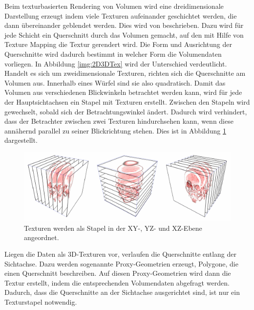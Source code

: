 Beim texturbasierten Rendering von Volumen wird eine dreidimensionale Darstellung erzeugt indem viele Texturen aufeinander geschichtet werden, die dann übereinander geblendet werden. Dies wird von \cite{kniss02} beschrieben. Dazu wird für jede Schicht ein Querschnitt durch das Volumen gemacht, auf den mit Hilfe von Texture Mapping die Textur gerendert wird.
Die Form und Ausrichtung der Querschnitte wird dadurch bestimmt in welcher Form die Volumendaten vorliegen. In Abbildung \ref{img:2D3DTex} wird der Unterschied verdeutlicht. Handelt es sich um zweidimensionale Texturen,  richten sich die Querschnitte am Volumen aus. Innerhalb eines Würfel sind sie also quadratisch. Damit das Volumen aus verschiedenen Blickwinkeln betrachtet werden kann, wird für jede der Hauptsichtachsen ein Stapel mit Texturen erstellt. Zwischen den Stapeln wird gewechselt, sobald sich der Betrachtungswinkel ändert. Dadurch wird verhindert, dass der Betrachter zwischen zwei Texturen hindurchsehen kann, wenn diese annähernd parallel zu seiner Blickrichtung stehen. Dies ist in Abbildung \ref{img:textureBased} dargestellt.

\begin{figure}[!htb]
	\centering
	\includegraphics[width=0.7\linewidth]{images/textureStacks.png}
	\caption{Texturen werden als Stapel in der 	XY-, YZ- und XZ-Ebene angeordnet.}
	\label{img:textureBased}
\end{figure}
\FloatBarrier

Liegen die Daten als 3D-Texturen vor, verlaufen die Querschnitte entlang der Sichtachse. Dazu werden sogenannte Proxy-Geometrien erzeugt, Polygone, die einen Querschnitt beschreiben. Auf diesen Proxy-Geometrien wird dann die Textur erstellt, indem die entsprechenden Volumendaten abgefragt werden. Dadurch, dass die Querschnitte an der Sichtachse ausgerichtet sind, ist nur ein Texturstapel notwendig. 






